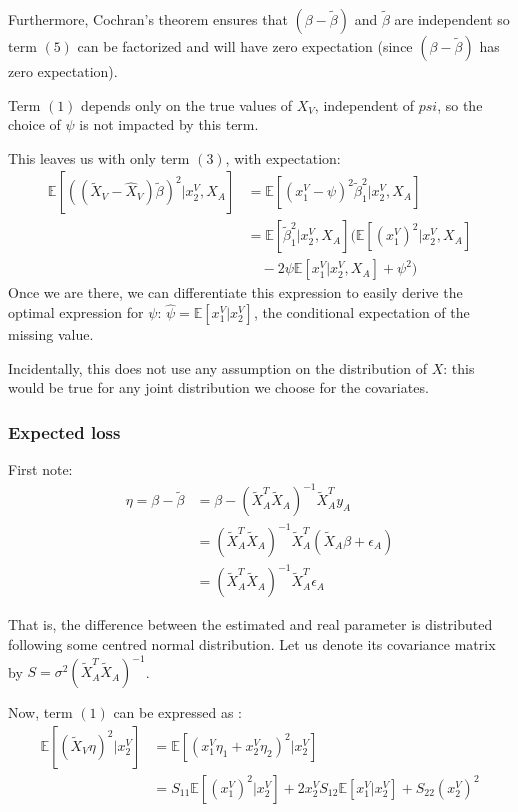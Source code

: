 \documentclass[12pt, a4paper]{memoir}
\begin{document}
Furthermore, Cochran's theorem ensures that $(\beta - \tilde{\beta})$ and $\tilde{\beta}$ are independent so term $(5)$ can be factorized and will have zero expectation (since $(\beta - \tilde{\beta})$ has zero expectation).

Term $(1)$ depends only on the true values of $X_V$, independent of $psi$, so the choice of $\psi$  is not impacted by this term.

This leaves us with only term $(3)$, with expectation:
\begin{align*}
\mathbb{E}[((\tilde{X}_V-\hat{X}_V)\tilde{\beta})^2 \vert x^V_2, X_A] &= \mathbb{E}[(x_1^V - \psi)^2 \tilde{\beta}_1^2 \vert x^V_2, X_A] \\
													&= \mathbb{E}[\tilde{\beta}_1^2 \vert x^V_2, X_A] (\mathbb{E}[(x_1^V)^2\vert x^V_2, X_A] \\
													& \quad - 2\psi \mathbb{E}[x_1^V\vert x^V_2, X_A] + \psi^2)
\end{align*}
Once we are there, we can differentiate this expression to easily derive the optimal expression for $\psi$: $\hat{\psi} = \mathbb{E}[x_1^V\vert x^V_2]$, the conditional expectation of the missing value.

Incidentally, this does not use any assumption on the distribution of $X$: this would be true for any joint distribution we choose for the covariates.

			\subsubsection{Expected loss}
First note:
\begin{align*}
\eta = \beta - \tilde{\beta} &= \beta - (\tilde{X}_A^T \tilde{X}_A)^{-1} \tilde{X}_A^T y_A \\
		&= (\tilde{X}_A^T \tilde{X}_A)^{-1} \tilde{X}_A^T (\tilde{X}_A \beta + \epsilon_A) \\
		&= (\tilde{X}_A^T \tilde{X}_A)^{-1} \tilde{X}_A^T \epsilon_A
\end{align*}

That is, the difference between the estimated and real parameter is distributed following some centred normal distribution. Let us denote its covariance matrix by $S = \sigma^2 (\tilde{X}_A^T \tilde{X}_A)^{-1} $.

Now, term $(1)$ can be expressed as :
\begin{align*}
\mathbb{E}[(\tilde{X}_V \eta)^2 \vert x^V_2] &= \mathbb{E}[(x^V_1 \eta_1 + x^V_2 \eta_2)^2\vert x^V_2] \\
											&= S_{11} \mathbb{E}[(x^V_1)^2 \vert x^V_2]  + 2x^V_2 S_{12} \mathbb{E}[x^V_1 \vert x^V_2] + S_{22} (x^V_2)^2
\end{align*}
\end{document}
